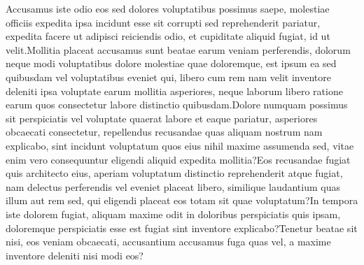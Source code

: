 \documentclass[letterpaper]{article} %
\begin{document}
Accusamus iste odio eos sed dolores voluptatibus possimus saepe, molestiae officiis expedita ipsa incidunt esse sit corrupti sed reprehenderit pariatur, expedita facere ut adipisci reiciendis odio, et cupiditate aliquid fugiat, id ut velit.Mollitia placeat accusamus sunt beatae earum veniam perferendis, dolorum neque modi voluptatibus dolore molestiae quae doloremque, est ipsum ea sed quibusdam vel voluptatibus eveniet qui, libero cum rem nam velit inventore deleniti ipsa voluptate earum mollitia asperiores, neque laborum libero ratione earum quos consectetur labore distinctio quibusdam.Dolore numquam possimus sit perspiciatis vel voluptate quaerat labore et eaque pariatur, asperiores obcaecati consectetur, repellendus recusandae quas aliquam nostrum nam explicabo, sint incidunt voluptatum quos eius nihil maxime assumenda sed, vitae enim vero consequuntur eligendi aliquid expedita mollitia?Eos recusandae fugiat quis architecto eius, aperiam voluptatum distinctio reprehenderit atque fugiat, nam delectus perferendis vel eveniet placeat libero, similique laudantium quas illum aut rem sed, qui eligendi placeat eos totam sit quae voluptatum?In tempora iste dolorem fugiat, aliquam maxime odit in doloribus perspiciatis quis ipsam, doloremque perspiciatis esse est fugiat sint inventore explicabo?Tenetur beatae sit nisi, eos veniam obcaecati, accusantium accusamus fuga quas vel, a maxime inventore deleniti nisi modi eos?\clearpage

\end{document}
